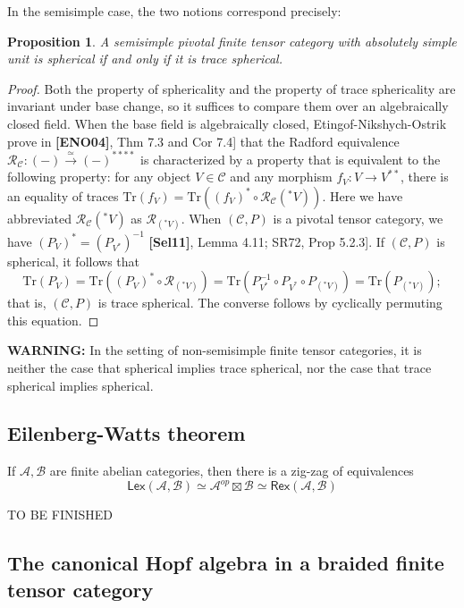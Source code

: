 \documentclass[11pt]{article}
\newcommand{\cat}[1]{\mathcal{#1}}
\newtheorem{proposition}[theorem]{Proposition}
\theoremstyle{definition}
\begin{document}
In the semisimple case, the two notions correspond precisely:

\begin{proposition}
A semisimple pivotal finite tensor category with absolutely simple unit is spherical if and only if it is trace spherical.
\end{proposition}

\begin{proof}
Both the property of sphericality and the property of trace sphericality are invariant under base change, so it suffices to compare them over an algebraically closed field. When the base field is algebraically closed, Etingof-Nikshych-Ostrik prove in \textbf{[ENO04]}, Thm 7.3 and Cor 7.4] that the Radford equivalence $\mathcal{R}_{\mathcal{C}} : (-) \xrightarrow{\simeq} (-)^{****}$ is characterized by a property that is equivalent to the following property: for any object $V \in \mathcal{C}$ and any morphism $f_V : V \to V^{**}$, there is an equality of traces $\mathrm{Tr}(f_V) = \mathrm{Tr}((f_V)^* \circ \mathcal{R}_{\mathcal{C}}(^*V))$. Here we have abbreviated $\mathcal{R}_{\mathcal{C}}(^*V)$ as $\mathcal{R}_{(^*V)}$. When $(\mathcal{C}, P)$ is a pivotal tensor category, we have $(P_V)^* = (P_{V^*})^{-1}$ \textbf{[Sel11]}, Lemma 4.11; SR72, Prop 5.2.3]. If $(\mathcal{C}, P)$ is spherical, it follows that
\[
\mathrm{Tr}(P_V)
= \mathrm{Tr}((P_V)^* \circ \mathcal{R}_{(^*V)})
= \mathrm{Tr}(P_{V^*}^{-1} \circ P_{V^*} \circ P_{(^*V)})
= \mathrm{Tr}(P_{(^*V)});
\]
that is, $(\mathcal{C}, P)$ is trace spherical. The converse follows by cyclically permuting this equation.
\end{proof}

\textbf{WARNING:} In the setting of non-semisimple finite tensor categories, it is neither the case that spherical implies trace spherical, nor the case that trace spherical implies spherical.


\subsection{Eilenberg-Watts theorem}


If $\mathcal{A}, \cat{B}$ are finite abelian categories, then there is a zig-zag of equivalences
$$  \mathsf{Lex}(\mathcal{A}, \cat{B}) \simeq \mathcal{A}^{op} \boxtimes \cat{B}   \simeq  \mathsf{Rex}(\mathcal{A}, \cat{B}) $$

{\color{red} TO BE FINISHED}



\subsection{The canonical Hopf algebra in a braided finite tensor category}
\end{document}

